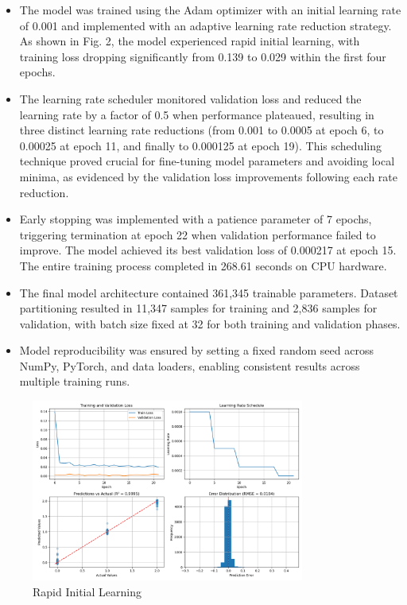 \documentclass[3p,times,procedia]{elsarticle}
\begin{document}
\begin{itemize}
    \item The model was trained using the Adam optimizer with an initial learning rate of 0.001 and implemented with an adaptive learning rate reduction strategy. As shown in Fig. 2, the model experienced rapid initial learning, with training loss dropping significantly from 0.139 to 0.029 within the first four epochs.
\item The learning rate scheduler monitored validation loss and reduced the learning rate by a factor of 0.5 when performance plateaued, resulting in three distinct learning rate reductions (from 0.001 to 0.0005 at epoch 6, to 0.00025 at epoch 11, and finally to 0.000125 at epoch 19). This scheduling technique proved crucial for fine-tuning model parameters and avoiding local minima, as evidenced by the validation loss improvements following each rate reduction.
\item Early stopping was implemented with a patience parameter of 7 epochs, triggering termination at epoch 22 when validation performance failed to improve. The model achieved its best validation loss of 0.000217 at epoch 15. The entire training process completed in 268.61 seconds on CPU hardware.
\item The final model architecture contained 361,345 trainable parameters. Dataset partitioning resulted in 11,347 samples for training and 2,836 samples for validation, with batch size fixed at 32 for both training and validation phases.
\item Model reproducibility was ensured by setting a fixed random seed across NumPy, PyTorch, and data loaders, enabling consistent results across multiple training runs.
\end{itemize}
\begin{figure}[!ht] %
    \centering
    \includegraphics[width=0.80\textwidth]{Picture2.png} %

    \caption{Rapid Initial Learning}
    \label{fig:learning_curve}
\end{figure}
\end{document}
